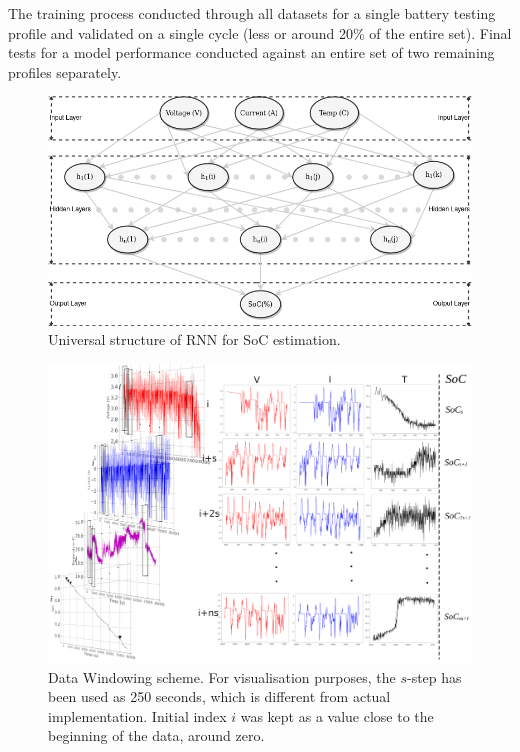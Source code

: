 %
%
The training process conducted through all datasets for a single battery testing profile and validated on a single cycle (less or around 20\% of the entire set).
Final tests for a model performance conducted against an entire set of two remaining profiles separately.
\begin{figure}[htbp]
    \centering
    \includegraphics[width=\linewidth]{II_Body/images/SoC-RNN.png}
    \caption{Universal structure of RNN for SoC estimation.}
    \label{fig:RNN-structure}
\end{figure}
\begin{landscape}
    \begin{figure}[ht]
        \centering
        \includegraphics[width=0.9\linewidth]{II_Body/images/Windowing3D-3.jpg}
        \caption{Data Windowing scheme. For visualisation purposes, the $s$-step has been used as 250 seconds, which is different from actual implementation. Initial index $i$ was kept as a value close to the beginning of the data, around zero.}
        \label{fig:Windowing}
    \end{figure}
\end{landscape}
%
%
